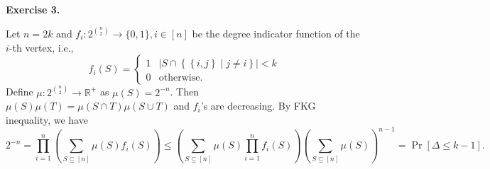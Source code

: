 \documentclass[a4paper]{article}
\newenvironment{exercise}[1]{
	\par
	\noindent\textbf{Exercise #1.}\quad
}{
	\par
	\bigskip
}
\newcommand{\abs}[1]{\left| #1 \right|}
\newcommand{\pbra}[1]{\left( #1 \right)}
\newcommand{\cbra}[1]{\left\{ #1 \right\}}
\newcommand{\sbra}[1]{\left[ #1 \right]}
\newcommand{\bin}{\{0,1\}}
\newcommand{\Rbb}{\mathbb{R}}
\begin{document}
\begin{exercise}{3}
    Let $n=2k$ and $f_i:2^{\binom n2}\to\bin,i\in[n]$ be the degree indicator function of the $i$-th vertex, i.e.,
    $$
    f_i(S)=\begin{cases}
        1 & \abs{S\cap\cbra{\cbra{i,j}\middle|j\neq i}}<k\\
        0 & \text{otherwise}.
    \end{cases}
    $$
    Define $\mu:2^{\binom n2}\to\Rbb^+$ as $\mu(S)=2^{-n}$. Then $\mu(S)\mu(T)=\mu(S\cap T)\mu(S\cup T)$ and $f_i$'s are 
    decreasing.
    By FKG inequality, we have
    $$
    2^{-n}=\prod_{i=1}^n\pbra{\sum_{S\subseteq[n]}\mu(S)f_i(S)}\leq\pbra{\sum_{S\subseteq[n]}\mu(S)\prod_{i=1}^nf_i(S)}
    \pbra{\sum_{S\subseteq[n]}\mu(S)}^{n-1}=\Pr\sbra{\Delta\leq k-1}.
    $$
\end{exercise}
\end{document}

